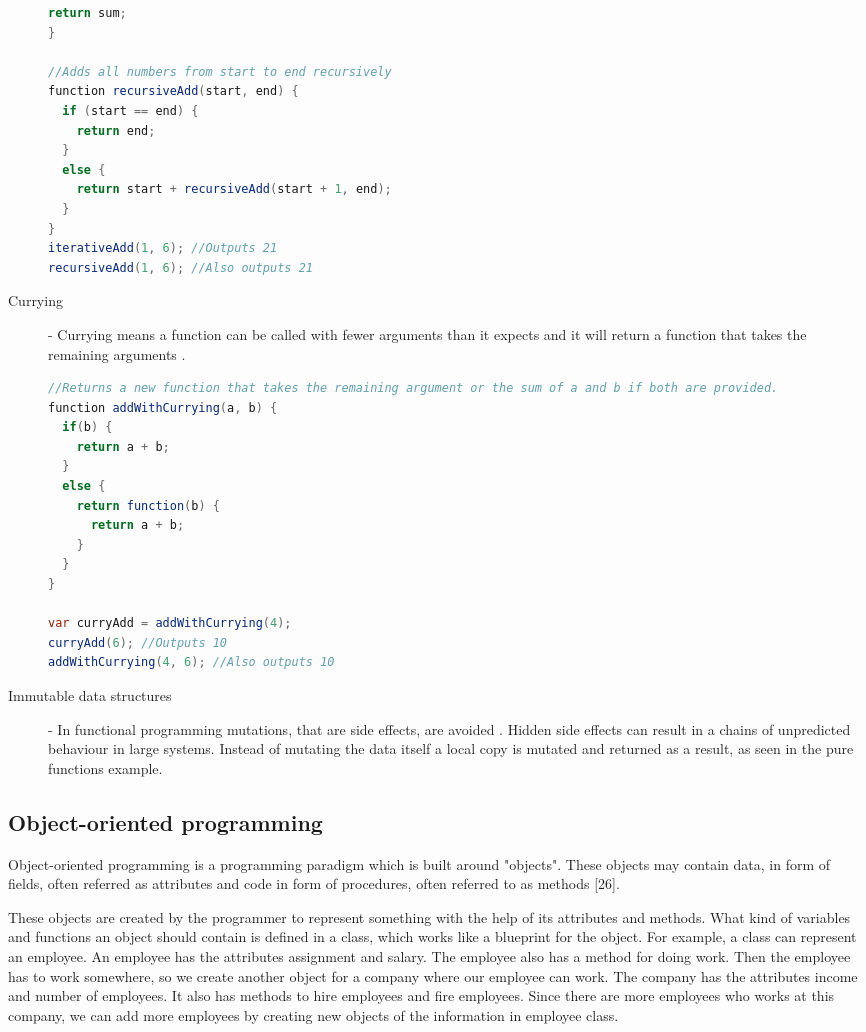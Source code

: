 \documentclass {article}
\begin{document}
\begin{description}
\begin{lstlisting}[language=Java]
  return sum;
}

//Adds all numbers from start to end recursively
function recursiveAdd(start, end) {
  if (start == end) {
    return end;
  }
  else {
    return start + recursiveAdd(start + 1, end);
  }
}
iterativeAdd(1, 6); //Outputs 21
recursiveAdd(1, 6); //Also outputs 21
\end{lstlisting}

\item [Currying] - Currying means a function can be called with fewer arguments than it expects and it will return a function that takes the remaining arguments \cite{drboolean}. 

\begin{lstlisting}[language=Java, breaklines=true]
//Returns a new function that takes the remaining argument or the sum of a and b if both are provided.
function addWithCurrying(a, b) {
  if(b) {
    return a + b;
  }
  else {
    return function(b) {
      return a + b;
    }
  }
}

var curryAdd = addWithCurrying(4); 
curryAdd(6); //Outputs 10
addWithCurrying(4, 6); //Also outputs 10
\end{lstlisting}

\item [Immutable data structures] - In functional programming mutations, that are side effects, are avoided \cite{fogus}. Hidden side effects can result in a chains of unpredicted behaviour in large systems. Instead of mutating the data itself a local copy is mutated and returned as a result, as seen in the pure functions example.
\end{description}
\subsection{Object-oriented programming}
Object-oriented programming is a programming paradigm which is built around "objects". These objects may contain data, in form of fields, often referred as attributes and code in form of procedures, often referred to as methods [26].

These objects are created by the programmer to represent something with the help of its attributes and methods. What kind of variables and functions an object should contain is defined in a class, which works like a blueprint for the object. For example, a class can represent an employee. An employee has the attributes assignment and salary. The employee also has a method for doing work. Then the employee has to work somewhere, so we create another object for a company where our employee can work. The company has the attributes income and number of employees. It also has methods to hire employees and fire employees. Since there are more employees who works at this company, we can add more employees by creating new objects of the information in employee class.
\end{document}
